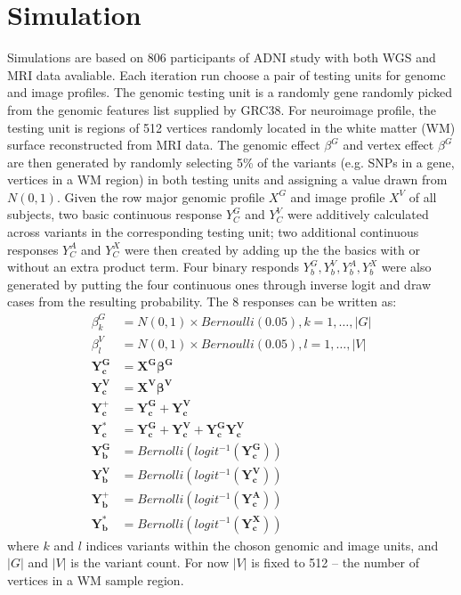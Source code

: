 \documentclass[twocolumn]{article}
\author{Xiaoran Tong}
\begin{document}
\section{Simulation}
Simulations are based on 806 participants of ADNI study with both WGS and MRI data avaliable. Each iteration run choose a pair of testing units for genomc and image profiles. The genomic testing unit is a randomly gene randomly picked from the genomic features list supplied by GRC38. For neuroimage profile, the testing unit is regions of 512 vertices randomly located in the white matter (WM) surface reconstructed from MRI data. The genomic effect $\beta^G$ and vertex effect $\beta^G$ are then generated by randomly selecting 5\% of the variants (e.g. SNPs in a gene, vertices in a WM region) in both testing units and assigning a value drawn from $N(0,1)$. Given the row major genomic profile $X^G$ and image profile $X^V$ of all subjects, two basic continuous response $Y^G_C$ and $Y^V_C$ were additively calculated across variants in the corresponding testing unit; two additional continuous responses $Y^A_C$ and $Y^X_C$ were then created by adding up the the basics with or without an extra product term. Four binary responds $Y^G_b, Y^V_b, Y^A_b, Y^X_b$ were also generated by putting the four continuous ones through inverse logit and draw cases from the resulting probability. The 8 responses can be written as:
\begin{equation*} \label{eq:SIM}
\begin{split}
  \beta^G_k &= N(0,1) \times Bernoulli(0.05), k=1, \dots, |G| \\
  \beta^V_l &= N(0,1) \times Bernoulli(0.05), l=1, \dots, |V| \\
  \boldsymbol{Y^G_c} &= \boldsymbol{X^G \beta^G} \\
  \boldsymbol{Y^V_c} &= \boldsymbol{X^V \beta^V} \\
  \boldsymbol{Y^+_c} &= \boldsymbol{Y^G_c} + \boldsymbol{Y^V_c} \\
  \boldsymbol{Y^*_c} &= \boldsymbol{Y^G_c} + \boldsymbol{Y^V_c} + \boldsymbol{Y^G_c Y^V_c} \\
  \boldsymbol{Y^G_b} &= Bernolli(logit^{-1}(\boldsymbol{Y^G_c})) \\
  \boldsymbol{Y^V_b} &= Bernolli(logit^{-1}(\boldsymbol{Y^V_c})) \\
  \boldsymbol{Y^+_b} &= Bernolli(logit^{-1}(\boldsymbol{Y^A_c})) \\
  \boldsymbol{Y^*_b} &= Bernolli(logit^{-1}(\boldsymbol{Y^X_c}))
\end{split}
\end{equation*}
where $k$ and $l$ indices variants within the choson genomic and image units, and $|G|$ and $|V|$ is the variant count. For now $|V|$ is fixed to 512 -- the number of vertices in a WM sample region.
\end{document}
